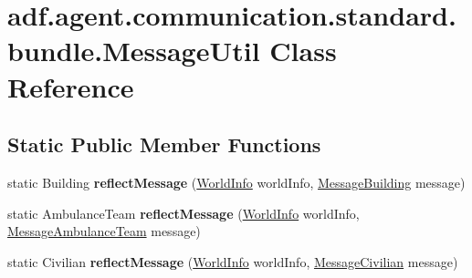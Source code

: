 \hypertarget{classadf_1_1agent_1_1communication_1_1standard_1_1bundle_1_1MessageUtil}{}\section{adf.\+agent.\+communication.\+standard.\+bundle.\+Message\+Util Class Reference}
\label{classadf_1_1agent_1_1communication_1_1standard_1_1bundle_1_1MessageUtil}
\subsection*{Static Public Member Functions}
\begin{DoxyCompactItemize}
\item 
\hypertarget{classadf_1_1agent_1_1communication_1_1standard_1_1bundle_1_1MessageUtil_a94909277987408d9742f77968f8f3cc7}{}\label{classadf_1_1agent_1_1communication_1_1standard_1_1bundle_1_1MessageUtil_a94909277987408d9742f77968f8f3cc7} 
static Building {\bfseries reflect\+Message} (\hyperlink{classadf_1_1agent_1_1info_1_1WorldInfo}{World\+Info} world\+Info, \hyperlink{classadf_1_1agent_1_1communication_1_1standard_1_1bundle_1_1information_1_1MessageBuilding}{Message\+Building} message)
\item 
\hypertarget{classadf_1_1agent_1_1communication_1_1standard_1_1bundle_1_1MessageUtil_ae68421169dd87266308d9a4c43173e41}{}\label{classadf_1_1agent_1_1communication_1_1standard_1_1bundle_1_1MessageUtil_ae68421169dd87266308d9a4c43173e41} 
static Ambulance\+Team {\bfseries reflect\+Message} (\hyperlink{classadf_1_1agent_1_1info_1_1WorldInfo}{World\+Info} world\+Info, \hyperlink{classadf_1_1agent_1_1communication_1_1standard_1_1bundle_1_1information_1_1MessageAmbulanceTeam}{Message\+Ambulance\+Team} message)
\item 
\hypertarget{classadf_1_1agent_1_1communication_1_1standard_1_1bundle_1_1MessageUtil_ac0cd71fb9606b50618c97180b278bcfc}{}\label{classadf_1_1agent_1_1communication_1_1standard_1_1bundle_1_1MessageUtil_ac0cd71fb9606b50618c97180b278bcfc} 
static Civilian {\bfseries reflect\+Message} (\hyperlink{classadf_1_1agent_1_1info_1_1WorldInfo}{World\+Info} world\+Info, \hyperlink{classadf_1_1agent_1_1communication_1_1standard_1_1bundle_1_1information_1_1MessageCivilian}{Message\+Civilian} message)
\item 
\hypertarget{classadf_1_1agent_1_1communication_1_1standard_1_1bundle_1_1MessageUtil_a73c97068f0ecbe0f7ca1b5e4e96a9b52}{}\label{classadf_1_1agent_1_1communication_1_1standard_1_1bundle_1_1MessageUtil_a73c97068f0ecbe0f7ca1b5e4e96a9b52} 

\end{DoxyCompactItemize}
